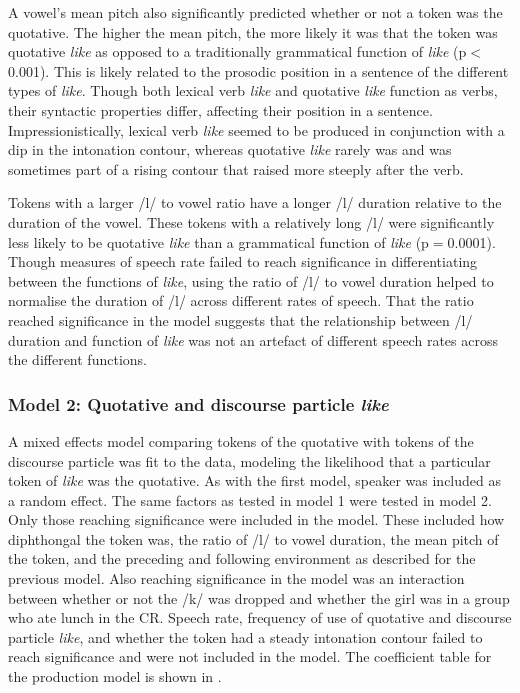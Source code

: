\largerpage
A vowel's mean pitch also significantly predicted whether or not a token was the quotative. The higher the mean pitch, the more likely it was that the token was quotative \textit{like} as opposed to a traditionally grammatical function of \textit{like} (p$<$0.001). This is likely related to the prosodic position in a sentence of the different types of \textit{like}. Though both lexical verb \textit{like} and quotative \textit{like} function as verbs, their syntactic properties differ, affecting their position in a sentence. Impressionistically, lexical verb \textit{like} seemed to be produced in conjunction with a dip in the intonation contour, whereas quotative \textit{like} rarely was and was sometimes part of a rising contour that raised more steeply after the verb. 

Tokens with a larger /l/ to vowel ratio have a longer /l/ duration relative to the duration of the vowel. These tokens with a relatively long /l/ were significantly less likely to be quotative \textit{like} than a grammatical function of \textit{like} (p$=$0.0001). Though measures of speech rate failed to reach significance in differentiating between the functions of \textit{like}, using the ratio of /l/ to vowel duration helped to normalise the duration of /l/ across different rates of speech. That the ratio reached significance in the model suggests that the relationship between /l/ duration and function of \textit{like} was not an artefact of different speech rates across the different functions.  



\subsubsection{Model 2: Quotative and discourse particle \textit{like}}

A mixed effects model comparing tokens of the quotative with tokens of the discourse particle was fit to the data, modeling the likelihood that a particular token of \textit{like} was the quotative. As with the first model, speaker was included as a random effect. The same factors as tested in model 1 were tested in model 2. Only those reaching significance were included in the model. These included how diphthongal the token was, the ratio of /l/ to vowel duration, the mean pitch of the token, and the preceding and following environment as described for the previous model. Also reaching significance in the model was an interaction between whether or not the /k/ was dropped and whether the girl was in a group who ate lunch in the CR. Speech rate, frequency of use of quotative and discourse particle \textit{like}, and whether the token had a steady intonation contour failed to reach significance and were not included in the model. The coefficient table for the production model is shown in . 
 
